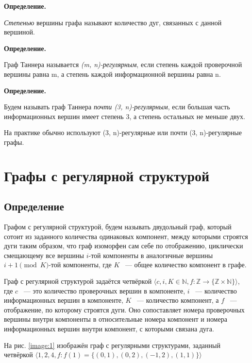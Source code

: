\documentclass[14pt]{mmcs-article}
\begin{document}
\textbf{Определение.}

\textsl{Степенью} вершины графа называют количество дуг, связанных с данной вершиной.

\textbf{Определение.}

Граф Таннера называется \textsl{(m, n)-регулярным}, если степень каждой проверочной вершины равна m, а степень каждой информационной вершины равна n.

\textbf{Определение.}

Будем называть граф Таннера \textsl{почти (3, n)-регулярным}, если большая часть информационных вершин имеет степень 3, а степень остальных не меньше двух.

На практике обычно используют (3, n)-регулярные или почти (3, n)-регулярные графы.

\newpage
\section{Графы с регулярной структурой}

\subsection{Определение}

Графом с регулярной структурой, будем называть двудольный граф, который сотоит из заданного количества одинаковых компонент, между которыми строятся дуги таким образом, что граф изоморфен сам себе по отображению, циклически смещающему все вершины $i$-той компоненты в аналогичные вершины $i + 1 \pmod K$-той компоненты, где $K$ ~--- общее количество компонент в графе.

Граф с регулярной структурой задаётся четвёркой $\langle c, i, K \in \mathbb{N}, f: \mathbb{Z} \rightarrow \{ \mathbb{Z} \times \mathbb{N} \} \rangle$, где $c$ ~--- это количество проверочных вершин в компоненте, $i$ ~--- количество информационных вершин в компоненте, $K$ ~--- количество компонент, а $f$ ~--- отображение, по которому строятся дуги. Оно сопоставляет номера проверочных вершины внутри компоненты в относительные номера компонент и номера информационных вершин внутри компонент, с которыми связана дуга.

На рис. \ref{image:1} изображён граф с регулярными структурами, заданный четвёркой $\langle 1, 2, 4, f: f(1) = \{ (0, 1), (0, 2), (-1, 2), (1, 1) \} \rangle$
\end{document}
